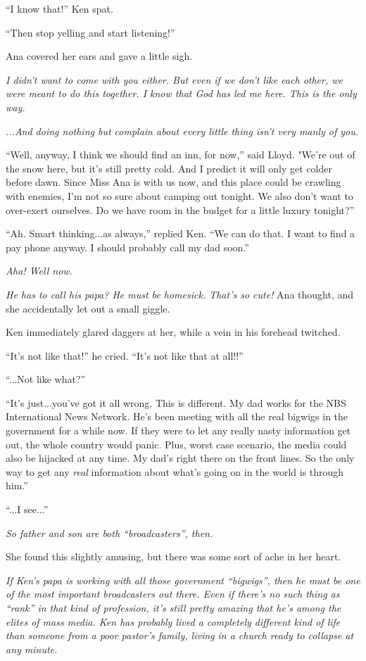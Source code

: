 \documentclass[
]{article}
\begin{document}
``I know that!'' Ken spat.

``Then stop yelling and start listening!''

Ana covered her ears and gave a little sigh.

\emph{I didn't want to come with you either. But even if we don't like
each other, we were meant to do this together. I know that God has led
me here. This is the only way.}

\emph{...And doing nothing but complain about every little thing isn't
very manly of you.}

``Well, anyway, I think we should find an inn, for now,'' said Lloyd.
"We're out of the snow here, but it's still pretty cold. And I predict
it will only get colder before dawn. Since Miss Ana is with us now, and
this place could be crawling with enemies, I'm not so sure about camping
out tonight. We also don't want to over-exert ourselves. Do we have room
in the budget for a little luxury tonight?''

``Ah. Smart thinking...as always,'' replied Ken. ``We can do that. I
want to find a pay phone anyway. I should probably call my dad soon.''

\emph{Aha! Well now.}

\emph{He has to call his papa? He must be homesick. That's so cute!} Ana
thought, and she accidentally let out a small giggle.

Ken immediately glared daggers at her, while a vein in his forehead
twitched.

``It's not like that!'' he cried. ``It's not like that at all!!''

``...Not like what?''

``It's just...you've got it all wrong. This is different. My dad works
for the NBS International News Network. He's been meeting with all the
real bigwigs in the government for a while now. If they were to let any
really nasty information get out, the whole country would panic. Plus,
worst case scenario, the media could also be hijacked at any time. My
dad's right there on the front lines. So the only way to get any
\emph{real} information about what's going on in the world is through
him.''

``...I see...''

\emph{So father and son are both ``broadcasters'', then.}

She found this slightly amusing, but there was some sort of ache in her
heart.

\emph{If Ken's papa is working with all those government ``bigwigs'',
then he must be one of the most important broadcasters out there. Even
if there's no such thing as ``rank'' in that kind of profession, it's
still pretty amazing that he's among the elites of mass media. Ken has
probably lived a completely different kind of life than someone from a
poor pastor's family, living in a church ready to collapse at any
minute.}
\end{document}
